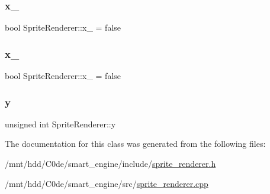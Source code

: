 \mbox{\label{classSpriteRenderer_a79a58b0a7a37be0f6a3d014e4529917f}} 
\subsubsection{\texorpdfstring{x\+\_}{x\_3}}
{\footnotesize\ttfamily bool Sprite\+Renderer\+::x\+\_ = false\hspace{0.3cm}{\ttfamily [private]}}

\mbox{\label{classSpriteRenderer_a1f1b9ed16ab7b22808b2ba3e056762cd}} 
\subsubsection{\texorpdfstring{x\+\_}{x\_4}}
{\footnotesize\ttfamily bool Sprite\+Renderer\+::x\+\_ = false\hspace{0.3cm}{\ttfamily [private]}}

\mbox{\label{classSpriteRenderer_a5a89882a658f79d41eb498055c9ee2ba}} 
\subsubsection{\texorpdfstring{y}{y}}
{\footnotesize\ttfamily unsigned int Sprite\+Renderer\+::y\hspace{0.3cm}{\ttfamily [private]}}



The documentation for this class was generated from the following files\+:\begin{DoxyCompactItemize}
\item 
/mnt/hdd/\+C0de/smart\+\_\+engine/include/\hyperlink{sprite__renderer_8h}{sprite\+\_\+renderer.\+h}\item 
/mnt/hdd/\+C0de/smart\+\_\+engine/src/\hyperlink{sprite__renderer_8cpp}{sprite\+\_\+renderer.\+cpp}\end{DoxyCompactItemize}
